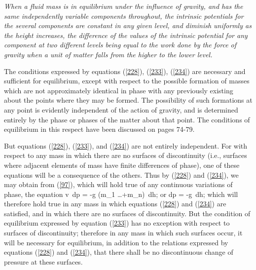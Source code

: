 \documentclass[12pt]{article}
\begin{document}
\textit{When a fluid mass is in equilibrium under the influence of gravity, and has the same independently variable components throughout, the intrinsic potentials for the several components are constant in any given level, and diminish uniformly as the height increases, the difference of the values of the intrinsic potential for any component at two different levels being equal to the work done by the force of gravity when a unit of matter falls from the higher to the lower level.}


The conditions expressed by equations (\ref{228}), (\ref{233}), (\ref{234}) are necessary and sufficient for equilibrium, except with respect to the possible formation of masses which are not approximately identical in phase with any previously existing about the points where they may be formed. The possibility of such formations at any point is evidently independent of the action of gravity, and is determined entirely by the phase or phases of the matter about that point. The conditions of equilibrium in this respect have been discussed on pages 74-79.


But equations (\ref{228}), (\ref{233}), and (\ref{234}) are not entirely independent. For with respect to any mass in which there are no surfaces of discontinuity (i.e., surfaces where adjacent elements of mass have finite differences of phase), one of these equations will be a consequence of the others. Thus by (\ref{228}) and (\ref{234}), we may obtain from (\ref{97}), which will hold true of any continuous variations of phase, the equation
\eqs v \,dp = -g (m_1 \dots +m_n) \,dh;  \label{235}\eqe
or     
\eqs     dp = -g \gamma \,dh;  \label{236}\eqe
which will therefore hold true in any mass in which equations (\ref{228}) and (\ref{234}) are satisfied, and in which there are no surfaces of discontinuity. But the condition of equilibrium expressed by equation (\ref{233}) has no exception with respect to surfaces of discontinuity; therefore in any mass in which such surfaces occur, it will be necessary for equilibrium, in addition to the relations expressed by equations (\ref{228}) and (\ref{234}), that there shall be no discontinuous change of pressure at these surfaces.
\end{document}
